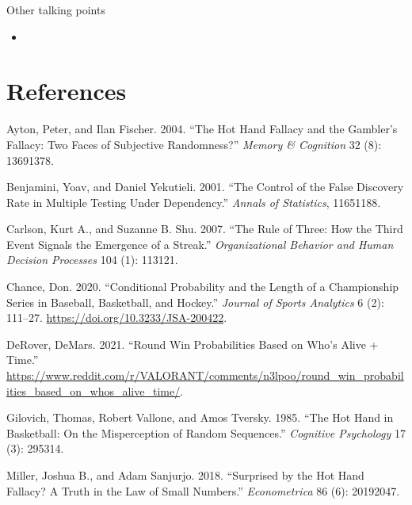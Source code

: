 \documentclass{article}
\providecommand{\tightlist}{%
  \setlength{\itemsep}{0pt}\setlength{\parskip}{0pt}}
\newlength{\cslhangindent}
\newlength{\cslentryspacingunit} %
\newenvironment{CSLReferences}[2] %
 {%
  \setlength{\parindent}{0pt}
  \ifodd #1
  \let\oldpar\par
  \def\par{\hangindent=\cslhangindent\oldpar}
  \fi
  \setlength{\parskip}{#2\cslentryspacingunit}
 }%
 {}
\begin{document}
Other talking points

\begin{itemize}
\tightlist
\item
\end{itemize}

\hypertarget{references}{%
\section*{References}\label{references}}

\hypertarget{refs}{}
\begin{CSLReferences}{1}{0}
\leavevmode{}%
Ayton, Peter, and Ilan Fischer. 2004. {``The Hot Hand Fallacy and the
Gambler{'}s Fallacy: Two Faces of Subjective Randomness?''} \emph{Memory
\& Cognition} 32 (8): 13691378.

\leavevmode{}%
Benjamini, Yoav, and Daniel Yekutieli. 2001. {``The Control of the False
Discovery Rate in Multiple Testing Under Dependency.''} \emph{Annals of
Statistics}, 11651188.

\leavevmode{}%
Carlson, Kurt A., and Suzanne B. Shu. 2007. {``The Rule of Three: How
the Third Event Signals the Emergence of a Streak.''}
\emph{Organizational Behavior and Human Decision Processes} 104 (1):
113121.

\leavevmode{}%
Chance, Don. 2020. {``Conditional Probability and the Length of a
Championship Series in Baseball, Basketball, and Hockey.''}
\emph{Journal of Sports Analytics} 6 (2): 111--27.
\url{https://doi.org/10.3233/JSA-200422}.

\leavevmode{}%
DeRover, DeMars. 2021. {``Round Win Probabilities Based on Who's Alive +
Time.''}
\url{https://www.reddit.com/r/VALORANT/comments/n3lpoo/round_win_probabilities_based_on_whos_alive_time/}.

\leavevmode{}%
Gilovich, Thomas, Robert Vallone, and Amos Tversky. 1985. {``The Hot
Hand in Basketball: On the Misperception of Random Sequences.''}
\emph{Cognitive Psychology} 17 (3): 295314.

\leavevmode{}%
Miller, Joshua B., and Adam Sanjurjo. 2018. {``Surprised by the Hot Hand
Fallacy? A Truth in the Law of Small Numbers.''} \emph{Econometrica} 86
(6): 20192047.


\end{CSLReferences}
\end{document}

